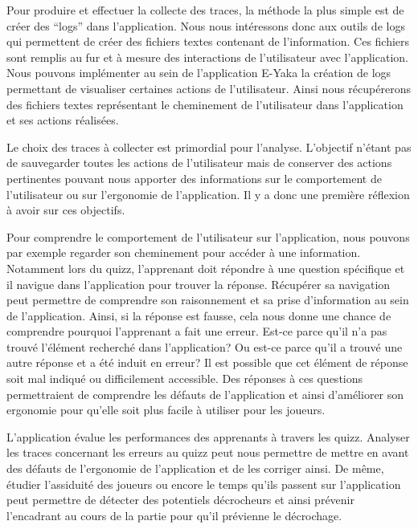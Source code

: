             Pour produire et effectuer la collecte des traces, la méthode la plus simple est de créer des “logs” dans l’application. Nous nous intéressons donc aux outils de logs qui permettent de créer des fichiers textes contenant de l’information. Ces fichiers sont remplis au fur et à mesure des interactions de l’utilisateur avec l’application. Nous pouvons implémenter au sein de l’application E-Yaka la création de logs permettant de visualiser certaines actions de l’utilisateur. Ainsi nous récupérerons des fichiers textes représentant le cheminement de l’utilisateur dans l’application et ses actions réalisées.
            
            Le choix des traces à collecter est primordial pour l’analyse. L’objectif n’étant pas de sauvegarder toutes les actions de l’utilisateur mais de conserver des actions pertinentes pouvant nous apporter des informations sur le comportement de l’utilisateur ou sur l’ergonomie de l’application. Il y a donc une première réflexion à avoir sur ces objectifs.
            
            Pour comprendre le comportement de l’utilisateur sur l’application, nous pouvons par exemple regarder son cheminement pour accéder à une information. Notamment lors du quizz, l’apprenant doit répondre à une question spécifique et il navigue dans l’application pour trouver la réponse. Récupérer sa navigation peut permettre de comprendre son raisonnement et sa prise d’information au sein de l’application. Ainsi, si la réponse est fausse, cela nous donne une chance de comprendre pourquoi l’apprenant a fait une erreur. Est-ce parce qu’il n’a pas trouvé l’élément recherché dans l’application? Ou est-ce parce qu’il a trouvé une autre réponse et a été induit en erreur? Il est possible que cet élément de réponse soit mal indiqué ou difficilement accessible. Des réponses à ces questions permettraient de comprendre les défauts de l’application et ainsi d’améliorer son ergonomie pour qu’elle soit plus facile à utiliser pour les joueurs.
            
            L’application évalue les performances des apprenants à travers les quizz. Analyser les traces concernant les erreurs au quizz peut nous permettre de mettre en avant des défauts de l’ergonomie de l’application et de les corriger ainsi. De même, étudier l’assiduité des joueurs ou encore le temps qu’ils passent sur l’application peut permettre de détecter des potentiels décrocheurs et ainsi prévenir l’encadrant au cours de la partie pour qu’il prévienne le décrochage.
        
